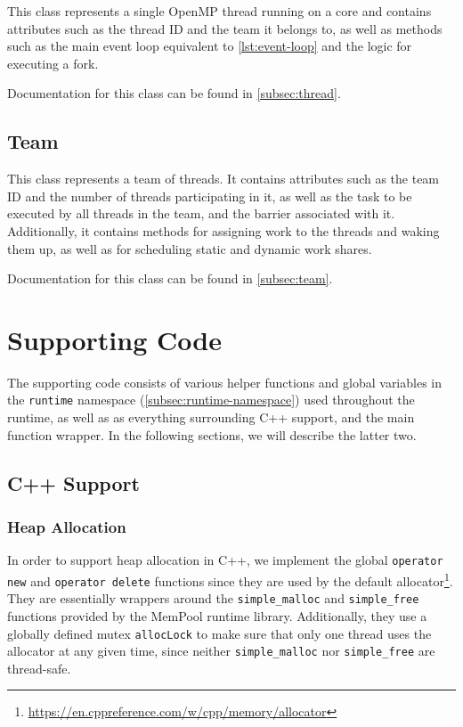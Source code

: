 This class represents a single OpenMP thread running on a core and contains attributes such as the
thread ID and the team it belongs to, as well as methods such as the main event loop equivalent to
\cref{lst:event-loop} and the logic for executing a fork.

Documentation for this class can be found in \cref{subsec:thread}.

\subsection{Team}

This class represents a team of threads. It contains attributes such as the team ID and the number
of threads participating in it, as well as the task to be executed by all threads in the team, and
the barrier associated with it. Additionally, it contains methods for assigning work to the threads
and waking them up, as well as for scheduling static and dynamic work shares.

Documentation for this class can be found in \cref{subsec:team}.

\section{Supporting Code}

The supporting code consists of various helper functions and global variables in the
\texttt{runtime} namespace (\cref{subsec:runtime-namespace}) used throughout the runtime, as well as
as everything surrounding C++ support, and the main function wrapper. In the following sections, we
will describe the latter two.

\subsection{C++ Support}
\label{subsec:cpp-support}

\subsubsection{Heap Allocation}

In order to support heap allocation in C++, we implement the global \texttt{operator new} and
\texttt{operator delete} functions since they are used by the default
allocator\footnote{\url{https://en.cppreference.com/w/cpp/memory/allocator}}. They are essentially
wrappers around the \texttt{simple\_malloc} and \texttt{simple\_free} functions provided by the
MemPool runtime library. Additionally, they use a globally defined mutex \texttt{allocLock} to make
sure that only one thread uses the allocator at any given time, since neither
\texttt{simple\_malloc} nor \texttt{simple\_free} are thread-safe.

